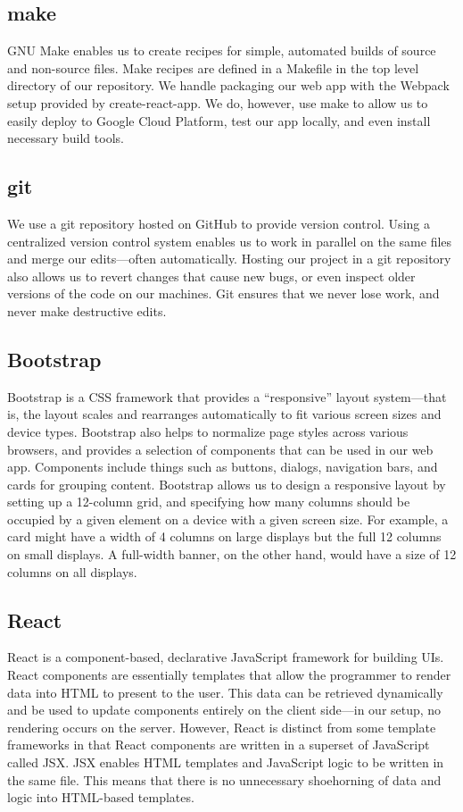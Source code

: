 \documentclass{scrartcl}
\begin{document}
    \subsection{make}
    GNU Make enables us to create recipes for simple, automated builds of source and non-source files. Make recipes are defined in a Makefile in the top level directory of our repository. We handle packaging our web app with the Webpack setup provided by create-react-app. We do, however, use make to allow us to easily deploy to Google Cloud Platform, test our app locally, and even install necessary build tools.

    \subsection{git}
    We use a git repository hosted on GitHub to provide version control. Using a centralized version control system enables us to work in parallel on the same files and merge our edits—often automatically. Hosting our project in a git repository also allows us to revert changes that cause new bugs, or even inspect older versions of the code on our machines. Git ensures that we never lose work, and never make destructive edits.

    \subsection{Bootstrap}
    Bootstrap is a CSS framework that provides a “responsive” layout system—that is, the layout scales and rearranges automatically to fit various screen sizes and device types. Bootstrap also helps to normalize page styles across various browsers, and provides a selection of components that can be used in our web app. Components include things such as buttons, dialogs, navigation bars, and cards for grouping content. Bootstrap allows us to design a responsive layout by setting up a 12-column grid, and specifying how many columns should be occupied by a given element on a device with a given screen size. For example, a card might have a width of 4 columns on large displays but the full 12 columns on small displays. A full-width banner, on the other hand, would have a size of 12 columns on all displays.

    \subsection{React}
    React is a component-based, declarative JavaScript framework for building UIs. React components are essentially templates that allow the programmer to render data into HTML to present to the user. This data can be retrieved dynamically and be used to update components entirely on the client side—in our setup, no rendering occurs on the server. However, React is distinct from some template frameworks in that React components are written in a superset of JavaScript called JSX. JSX enables HTML templates and JavaScript logic to be written in the same file. This means that there is no unnecessary shoehorning of data and logic into HTML-based templates.
\end{document}
